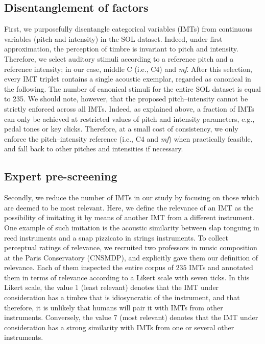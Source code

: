 \documentclass{bmcart}
\makeatletter
\newcommand*{\eg}{e.g.,\@\xspace}
\newcommand*{\ie}{i.e.,\@\xspace}
\makeatother
\begin{document}
\subsection*{Disentanglement of factors}
First, we purposefully disentangle categorical variables (IMTs) from continuous variables (pitch and intensity) in the SOL dataset.
Indeed, under first approximation, the perception of timbre is invariant to pitch and intensity.
Therefore, we select auditory stimuli according to a reference pitch and a reference intensity; in our case, middle C (\ie{} C4) and \emph{mf}. %
After this selection, every IMT triplet contains a single acoustic exemplar, regarded as canonical in the following.
The number of canonical stimuli for the entire SOL dataset is equal to 235.
We should note, however, that the proposed pitch--intensity cannot be strictly enforced across all IMTs.
Indeed, as explained above, a fraction of IMTs can only be achieved at restricted values of pitch and intensity parameters, \eg{} pedal tones or key clicks.
Therefore, at a small cost of consistency, we only enforce the pitch--intensity reference (\ie{} C4 and \emph{mf}) when practically feasible, and fall back to other pitches and intensities if necessary.


\subsection*{Expert pre-screening}
Secondly, we reduce the number of IMTs in our study by focusing on those which are deemed to be most relevant.
Here, we define the relevance of an IMT as the possibility of imitating it by means of another IMT from a different instrument.
One example of such imitation is the acoustic similarity between slap tonguing in reed instruments and a snap pizzicato in strings instruments.
To collect perceptual ratings of relevance, we recruited two professors in music composition at the Paris Conservatory (CNSMDP), and explicitly gave them our definition of relevance.
Each of them inspected the entire corpus of $235$ IMTs and annotated them in terms of relevance according to a Likert scale with seven ticks.
In this Likert scale, the value 1 (least relevant) denotes that the IMT under consideration has a timbre that is idiosyncratic of the instrument, and that therefore, it is unlikely that humans will pair it with IMTs from other instruments.
Conversely, the value 7 (most relevant) denotes that the IMT under consideration has a strong similarity with IMTs from one or several other instruments.
\end{document}
